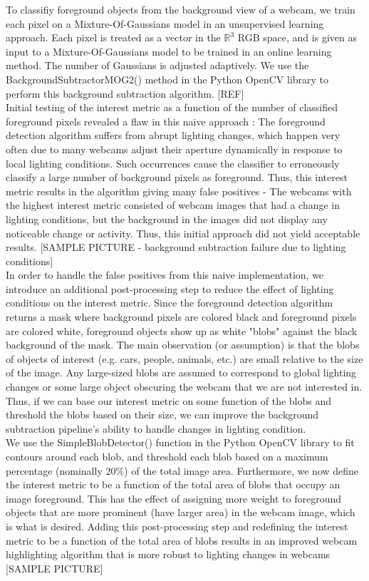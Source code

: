 \documentclass{article}
\begin{document}
To classifiy foreground objects from the background view of a webcam, we train each pixel on a Mixture-Of-Gaussians model in an unsupervised learning approach. Each pixel is treated as a vector in the $\mathbb{R}^3$ RGB space, and is given as input to a Mixture-Of-Gaussians model to be trained in an online learning method. The number of Gaussians is adjusted adaptively. We use the BackgroundSubtractorMOG2() method in the Python OpenCV library to perform this background subtraction algorithm. [REF]\\

Initial testing of the interest metric as a function of the number of classified foreground pixels revealed a flaw in this naive approach : The foreground detection algorithm suffers from abrupt lighting changes, which happen very often due to many webcams adjust their aperture dynamically in response to local lighting conditions. Such occurrences cause the classifier to erroneously classify a large number of background pixels as foreground. Thus, this interest metric results in the algorithm giving many false positives - The webcams with the highest interest metric consisted of webcam images that had a change in lighting conditions, but the background in the images did not display any noticeable change or activity. Thus, this initial approach did not yield acceptable results.  [SAMPLE PICTURE - background subtraction failure due to lighting conditions] \\

In order to handle the false positives from this naive implementation, we introduce an additional post-processing step to reduce the effect of lighting conditions on the interest metric. Since the foreground detection algorithm returns a mask where background pixels are colored black and foreground pixels are colored white, foreground objects show up as white "blobs" against the black background of the mask. The main observation (or assumption) is that the blobs of objects of interest (e.g. cars, people, animals, etc.) are small relative to the size of the image. Any large-sized blobs are assumed to correspond to global lighting changes or some large object obscuring the webcam that we are not interested in. Thus, if we can base our interest metric on some function of the blobs and threshold the blobs based on their size, we can improve the background subtraction pipeline's ability to handle changes in lighting condition. \\

We use the SimpleBlobDetector() function in the Python OpenCV library to fit contours around each blob, and threshold each blob based on a maximum percentage (nominally 20\%) of the total image area. Furthermore, we now define the interest metric to be a function of the total area of blobs that occupy an image foreground. This has the effect of assigning more weight to foreground objects that are more prominent (have larger area) in the webcam image, which is what is desired. Adding this post-processing step and redefining the interest metric to be a function of the total area of blobs results in an improved webcam highlighting algorithm that is more robust to lighting changes in webcams [SAMPLE PICTURE]\\
\end{document}

